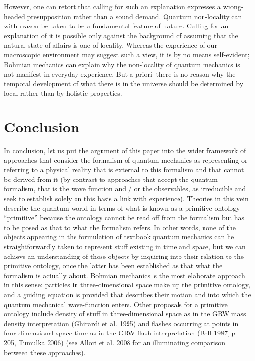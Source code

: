 \documentclass[12pt]{article}
\theoremstyle{definition}
\begin{document}
However, one can retort that calling for such an explanation expresses a wrong-headed presupposition rather than a sound demand. Quantum non-locality can with reason be taken to be a fundamental feature of nature. Calling for an explanation of it is possible only against the background of assuming that the natural state of affairs is one of locality. Whereas the experience of our macroscopic environment may suggest such a view, it is by no means self-evident; Bohmian mechanics can explain why the non-locality of quantum mechanics is not manifest in everyday experience. But a priori, there is no reason why the temporal development of what there is in the universe should be determined by local rather than by holistic properties.

\section{Conclusion}

In conclusion, let us put the argument of this paper into the wider framework of approaches that consider the formalism of quantum mechanics as representing or referring to a physical reality that is external to this formalism and that cannot be derived from it (by contrast to approaches that accept the quantum formalism, that is the wave function and / or the observables, as irreducible and seek to establish solely on this basis a link with experience). Theories in this vein describe the quantum world in terms of what is known as a primitive ontology -- ``primitive'' because the ontology cannot be read off from the formalism but has to be posed as that to what the formalism refers. In other words, none of the objects appearing in the formulation of textbook quantum mechanics can be straightforwardly taken to represent stuff existing in time and space, but we can achieve an understanding of those objects by inquiring into their relation to the primitive ontology, once the latter has been established as that what the formalism is actually about. Bohmian mechanics is the most elaborate approach in this sense: particles in three-dimensional space make up the primitive ontology, and a guiding equation is provided that describes their motion and into which the quantum mechanical wave-function enters. Other proposals for a primitive ontology include density of stuff in three-dimensional space as in the GRW mass density interpretation (Ghirardi et al. 1995) and flashes occurring at points in four-dimensional space-time as in the GRW flash interpretation (Bell 1987, p. 205, Tumulka 2006) (see Allori et al. 2008 for an illuminating comparison between these approaches).
\end{document}
